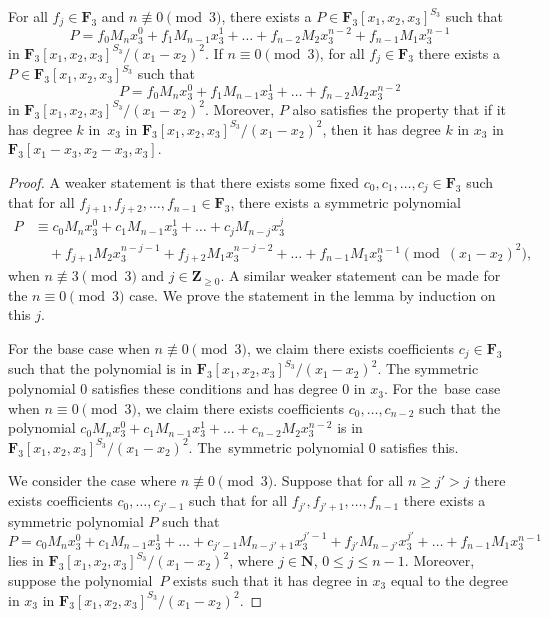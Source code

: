 \begin{Lemma}\label{symAll}
 For all $f_j\in \mathbf{F}_3$ and $n\not\equiv 0\pmod{3}$, there exists a $P\in \mathbf{F}_3[x_1,x_2,x_3]^{S_3}$ such that
 \[P= f_0M_nx_3^0+f_1M_{n-1}x_3^1+\dots + f_{n-2}M_2x_3^{n-2}+f_{n-1}M_1x_3^{n-1}\]
 in $\mathbf{F}_3[x_1,x_2,x_3]^{S_3}/(x_1-x_2)^2$. If $n\equiv 0\pmod{3}$, for all $f_j\in \mathbf{F}_3$ there exists a $P\in \mathbf{F}_3[x_1,x_2,x_3]^{S_3}$ such that
 \[P= f_0M_nx_3^0+f_1M_{n-1}x_3^1+\dots + f_{n-2}M_2x_3^{n-2}\]
 in $\mathbf{F}_3[x_1,x_2,x_3]^{S_3}/(x_1-x_2)^2$. Moreover, $P$ also satisfies the property that if it has degree $k$ in~$x_3$ in $\mathbf{F}_3[x_1,x_2,x_3]^{S_3}/(x_1-x_2)^2$, then it has degree $k$ in $x_3$ in $\mathbf{F}_3[x_1-x_3,x_2-x_3,x_3]$.
\end{Lemma}
\begin{proof}
 A weaker statement is that there exists some fixed $c_0, c_1, \dots, c_j\in\mathbf{F}_3$ such that for all $f_{j+1},f_{j+2},\dots,f_{n-1}\in \mathbf{F}_3$, there exists a symmetric polynomial
 \begin{align*}
 P&\equiv c_0M_nx_3^0+c_1M_{n-1}x_3^1+\dots + c_jM_{n-j}x_3^j\\
 &\quad +f_{j+1}M_2x_3^{n-j-1}+f_{j+2}M_1x_3^{n-j-2}+\dots+ f_{n-1}M_1x_3^{n-1}\pmod{(x_1-x_2)^2},
 \end{align*}
 when $n\not\equiv 3\pmod{3}$ and $j\in \mathbf{Z}_{\geq 0}$. A similar weaker statement can be made for the $n\equiv 0\pmod{3}$ case. We prove the statement in the lemma by induction on this $j$.

 For the base case when $n\not\equiv 0\pmod{3}$, we claim there exists coefficients $c_j\in \mathbf{F}_3$ such that the polynomial  is in $\mathbf{F}_3[x_1,x_2,x_3]^{S_3}/(x_1-x_2)^2$. The symmetric polynomial $0$ satisfies these conditions and has degree $0$ in $x_3$. For the~base case when $n\equiv 0\pmod{3}$, we claim there exists coefficients $c_0,\dots,c_{n-2}$ such that the polynomial $c_0M_nx_3^0+c_1M_{n-1}x_3^1+\dots + c_{n-2}M_2x_3^{n-2}$ is in $\mathbf{F}_3[x_1,x_2,x_3]^{S_3}/(x_1-x_2)^2$. The~symmetric polynomial $0$ satisfies this.

 We consider the case where $n\not\equiv 0\pmod{3}$. Suppose that for all $n\geq j'>j$ there exists coefficients $c_0,\dots,c_{j'-1}$ such that for all $f_{j'},f_{j'+1},\dots, f_{n-1}$ there exists a symmetric polynomial $P$ such that
 \[P = c_0M_nx_3^0+c_1M_{n-1}x_3^1+\dots + c_{j'-1}M_{n-j'+1}x_3^{j'-1}+f_{j'}M_{n-j'}x_3^{j'}+\dots + f_{n-1}M_1x_3^{n-1}\]
 lies in $\mathbf{F}_3[x_1,x_2,x_3]^{S_3}/(x_1-x_2)^2$, where $j\in \mathbf{N}$, $0\leq j\leq n-1$. Moreover, suppose the polynomial~$P$ exists such that it has degree in $x_3$ equal to the degree in $x_3$ in $\mathbf{F}_3[x_1,x_2,x_3]^{S_3}/(x_1-x_2)^2$.


\end{proof}
